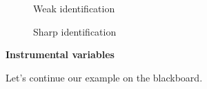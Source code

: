 \begin{frame}

\begin{figure}[htp]\centering
\caption{Weak identification}
\end{figure}
\end{frame}
\begin{frame}
\begin{figure}[htp]\centering
\caption{Sharp identification}
\end{figure}
\end{frame}
\begin{frame}\textbf{Instrumental variables}\vspace{1cm}

\begin{center}
Let's continue our example on the blackboard.
\end{center}

\end{frame}
